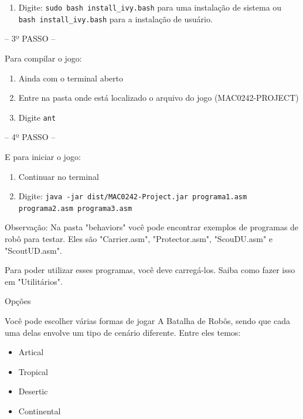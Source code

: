 \documentclass[a4paper]{article}
\begin{document}
{{{\begin{enumerate}
    \item Digite: \texttt{sudo bash install\_ivy.bash} para uma instalação
          de sistema ou \texttt{bash install\_ivy.bash} para a
          instalação de usuário.
    
\end{enumerate}

\bigskip


\textcolor{NavyBlue}{-- 3º PASSO --}

Para compilar o jogo:

\begin{enumerate}
	\item Ainda com o terminal aberto

	\item Entre na pasta onde está localizado o arquivo do jogo (MAC0242-PROJECT)

	\item Digite \texttt{ant}
\end{enumerate}

\bigskip



\textcolor{NavyBlue}{-- 4º PASSO --}

E para iniciar o jogo: 

\begin{enumerate}                                            
	\item Continuar no terminal
 	\item Digite: \texttt{java -jar dist/MAC0242-Project.jar
          programa1.asm programa2.asm programa3.asm}
\end{enumerate}

Observação: Na pasta "behaviors" você pode encontrar exemplos de 
programas de robô para testar.
Eles são "Carrier.asm", "Protector.asm", "ScouDU.asm" e "ScoutUD.asm".

Para poder utilizar esses programas, você deve carregá-los. Saiba 
como fazer isso em "Utilitários".

\bigskip


\newpage %

{\textcolor{NavyBlue}{\LARGE Opções}

Você pode escolher várias formas de jogar A Batalha de Robôs,
sendo que cada uma delas envolve um tipo de cenário diferente.
Entre eles temos:

\begin{itemize}
	\item Artical
	\item Tropical
	\item Desertic
	\item Continental
\end{itemize}

}}}}
\end{document}

